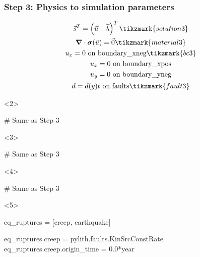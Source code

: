 \documentclass[aspectratio=169]{beamer}
\begin{document}
\begin{frame}[t,fragile]
  \frametitle{Step 3: Physics to simulation parameters}
  \summary{}

  \vspace*{-2\baselineskip}
  \begin{minipage}[t]{0.3\textwidth}
    {\scriptsize
    \begin{gather*}
    \vec{s}^T = \left( \vec{u} \quad \vec{\lambda} \right)^T \tikzmark{solution3}\\
    \tensor{\nabla} \cdot \tensor{\sigma}(\vec{u}) = \vec{0} \tikzmark{material3}\\
    u_x = 0 \text{ on boundary\_xneg} \tikzmark{bc3}\\
    u_x = 0 \text{ on boundary\_xpos} \\
    u_y = 0 \text{ on boundary\_yneg} \\
    d = \dot{d}(y) t \text{ on faults} \tikzmark{fault3}
    \end{gather*}}
  \end{minipage}
  \hfill
  \begin{minipage}[t]{0.67\textwidth}
    \begin{onlyenv}<2>
      \begin{cfgcode}
        # Same as Step 3
      \end{cfgcode}
    \end{onlyenv}
    \begin{onlyenv}<3>
      \begin{cfgcode}
        # Same as Step 3
      \end{cfgcode}
    \end{onlyenv}
    \begin{onlyenv}<4>
      \begin{cfgcode}
        # Same as Step 3
      \end{cfgcode}
    \end{onlyenv}
    \begin{onlyenv}<5>
      \begin{cfgcode}
        eq_ruptures = [creep, earthquake]

        eq_ruptures.creep = pylith.faults.KinSrcConstRate
        eq_ruptures.creep.origin_time = 0.0*year


\end{cfgcode}
\end{onlyenv}
\end{minipage}
\end{frame}
\end{document}
